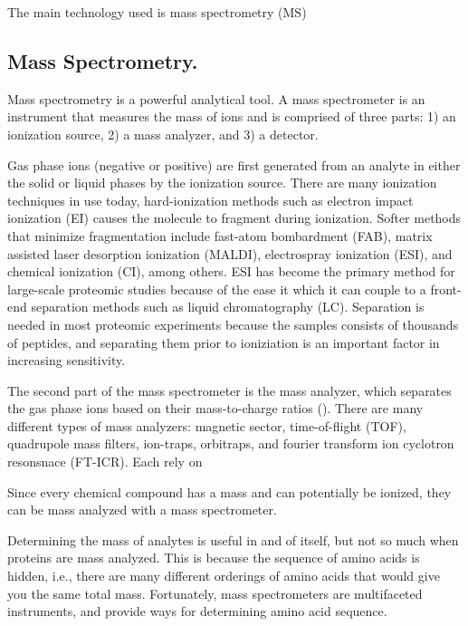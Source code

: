 The main technology used is mass spectrometry (MS)

\subsection*{Mass Spectrometry.}
Mass spectrometry is a powerful analytical tool. A mass spectrometer is an instrument that measures the mass of ions and is comprised of three parts: 1) an ionization source, 2) a mass analyzer, and 3) a detector. 

Gas phase ions (negative or positive) are first generated from an analyte in either the solid or liquid phases by the ionization source. There are many ionization techniques in use today, hard-ionization methods such as electron impact ionization (EI) causes the molecule to fragment during ionization. Softer methods that minimize fragmentation include fast-atom bombardment (FAB), matrix assisted laser desorption ionization (MALDI), electrospray ionization (ESI), and chemical ionization (CI), among others. ESI has become the primary method for large-scale proteomic studies because of the ease it which it can couple to a front-end separation methods such as liquid chromatography (LC). Separation is needed in most proteomic experiments because the samples consists of thousands of peptides, and separating them prior to ioniziation is an important factor in increasing sensitivity. 

The second part of the mass spectrometer is the mass analyzer, which separates the gas phase ions based on their mass-to-charge ratios (\mz{}). There are many different types of mass analyzers: magnetic sector, time-of-flight (TOF), quadrupole mass filters, ion-traps, orbitraps, and fourier transform ion cyclotron resonsnace (FT-ICR). Each rely on 


Since every chemical compound has a mass and can potentially be ionized, they can be mass analyzed with a mass spectrometer.

Determining the mass of analytes is useful in and of itself, but not so much when proteins are mass analyzed. This is because the sequence of amino acids is hidden, i.e., there are many different orderings of amino acids that would give you the same total mass. Fortunately, mass spectrometers are multifaceted instruments, and provide ways for determining amino acid sequence.



